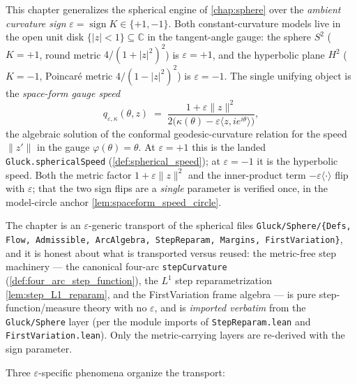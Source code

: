 This chapter generalizes the spherical engine of \cref{chap:sphere} over the
\emph{ambient curvature sign} $\varepsilon = \operatorname{sign} K \in
\{+1,-1\}$. Both constant-curvature models live in the open unit disk
$\{|z|<1\}\subseteq\mathbb C$ in the tangent-angle gauge: the sphere
$S^2$ ($K=+1$, round metric $4/(1+|z|^2)^2$) is $\varepsilon=+1$, and the
hyperbolic plane $H^2$ ($K=-1$, Poincar\'e metric $4/(1-|z|^2)^2$) is
$\varepsilon=-1$. The single unifying object is the \emph{space-form gauge
speed}
\[
  q_{\varepsilon,\kappa}(\theta,z)
  \;=\;\frac{1+\varepsilon\|z\|^2}
        {2\bigl(\kappa(\theta)-\varepsilon\langle z, ie^{i\theta}\rangle\bigr)},
\]
the algebraic solution of the conformal geodesic-curvature relation for the
speed $\|z'\|$ in the gauge $\varphi(\theta)=\theta$. At $\varepsilon=+1$ this
is the landed \texttt{Gluck.sphericalSpeed} (\cref{def:spherical_speed}); at
$\varepsilon=-1$ it is the hyperbolic speed. Both the metric factor
$1+\varepsilon\|z\|^2$ and the inner-product term $-\varepsilon\langle
\cdot\rangle$ flip with $\varepsilon$; that the two sign flips are a
\emph{single} parameter is verified once, in the model-circle anchor
\cref{lem:spaceform_speed_circle}.

The chapter is an $\varepsilon$-generic transport of the spherical files
\texttt{Gluck/Sphere/\{Defs, Flow, Admissible, ArcAlgebra, StepReparam,
Margins, FirstVariation\}}, and it is honest about what is transported versus
reused: the metric-free step machinery — the canonical four-arc
\texttt{stepCurvature} (\cref{def:four_arc_step_function}), the $L^1$
step reparametrization \cref{lem:step_L1_reparam}, and the FirstVariation
frame algebra — is pure step-function/measure theory with no $\varepsilon$,
and is \emph{imported verbatim} from the \texttt{Gluck/Sphere} layer (per the
module imports of \texttt{StepReparam.lean} and \texttt{FirstVariation.lean}).
Only the metric-carrying layers are re-derived with the sign parameter.

Three $\varepsilon$-specific phenomena organize the transport:

